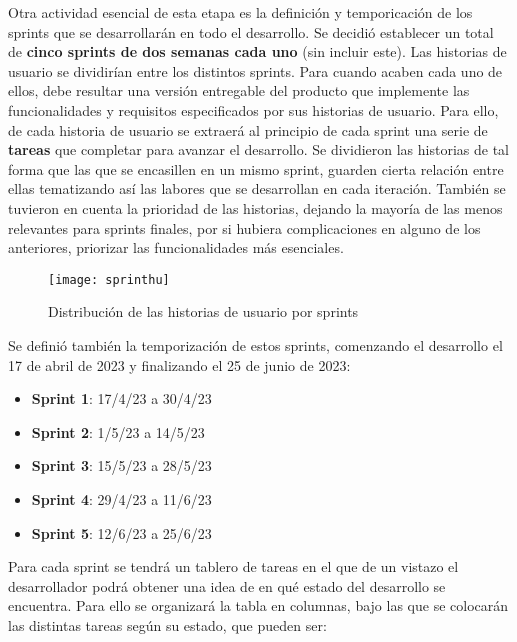 Otra actividad esencial de esta etapa es la definición y temporicación de los sprints que se desarrollarán en todo el desarrollo. Se decidió establecer un total de \textbf{cinco sprints de dos semanas cada uno} (sin incluir este). Las historias de usuario se dividirían entre los distintos sprints. Para cuando acaben cada uno de ellos, debe resultar una versión entregable del producto que implemente las funcionalidades y requisitos especificados por sus historias de usuario. Para ello, de cada historia de usuario se extraerá al principio de cada sprint una serie de \textbf{tareas} que completar para avanzar el desarrollo. Se dividieron las historias de tal forma que las que se encasillen en un mismo sprint, guarden cierta relación entre ellas tematizando así las labores que se desarrollan en cada iteración. También se tuvieron en cuenta la prioridad de las historias, dejando la mayoría de las menos relevantes para sprints finales, por si hubiera complicaciones en alguno de los anteriores, priorizar las funcionalidades más esenciales.

\begin{figure}[h]
    \centering
    \texttt{[image: sprinthu]}
    \caption[Planificación de HU por sprints]{Distribución de las historias de usuario por sprints}
\end{figure}

Se definió también la temporización de estos sprints, comenzando el desarrollo el 17 de abril de 2023 y finalizando el 25 de junio de 2023:
\begin{itemize}
    \item \textbf{Sprint 1}: 17/4/23 a 30/4/23
    \item \textbf{Sprint 2}: 1/5/23 a 14/5/23
    \item \textbf{Sprint 3}: 15/5/23 a 28/5/23
    \item \textbf{Sprint 4}: 29/4/23 a 11/6/23
    \item \textbf{Sprint 5}: 12/6/23 a 25/6/23
\end{itemize}

Para cada sprint se tendrá un tablero de tareas en el que de un vistazo el desarrollador podrá obtener una idea de en qué estado del desarrollo se encuentra. Para ello se organizará la tabla en columnas, bajo las que se colocarán las distintas tareas según su estado, que pueden ser:

